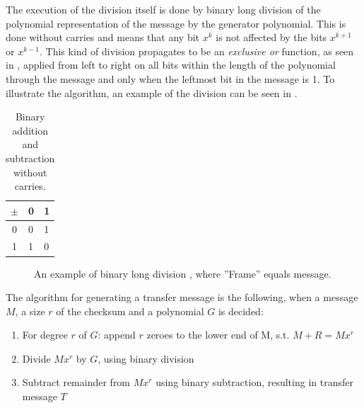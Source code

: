 The execution of the division itself is done by binary long division of the polynomial representation of the message by the generator polynomial. This is done without carries and means that any bit $x^k$ is not affected by the bits $x^{k+1}$ or $x^{k-1}$. This kind of division propagates to be an \textit{exclusive or} function, as seen in , applied from left to right on all bits within the length of the polynomial through the message and only when the leftmost bit in the message is 1. To illustrate the algorithm, an example of the division can be seen in .

\begin{table}[h!]
	\centering
	\begin{tabular}{c|ll}
		$\pm$ & 0 & 1 \\
		\hline
		0   & 0 & 1 \\
		1   & 1 & 0
	\end{tabular}
	\caption{Binary addition and subtraction without carries.}
	\label{tab:binaryxor}
\end{table}


\begin{figure}[!h]
	\centering
	\caption{An example of binary long division \cite{tanenbaum81}, where ''Frame'' equals message.}
	\label{fig:crccalc}
\end{figure}

The algorithm for generating a transfer message is the following, when a message $M$, a size $r$ of the checksum and a polynomial $G$ is decided:
\begin{enumerate}
	\item For degree $r$ of $G$: append $r$ zeroes to the lower end of M, s.t. $M+R = Mx^r$
	\item Divide $Mx^r$ by $G$, using binary division
	\item Subtract remainder from $Mx^r$ using binary subtraction, resulting in transfer message $T$
\end{enumerate}

